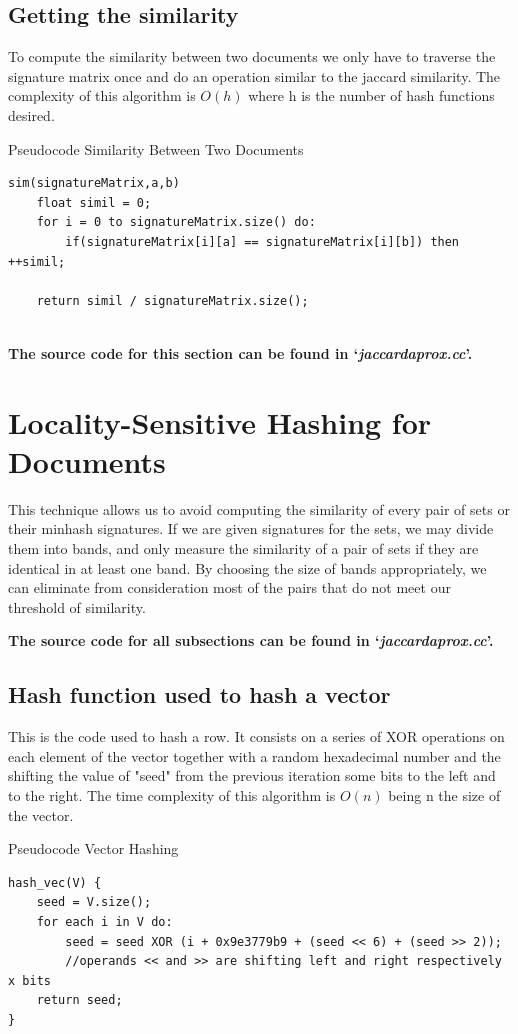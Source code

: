 \documentclass[12pt]{article}
\begin{document}
\subsection{Getting the similarity}
To compute the similarity between two documents we only have to traverse the signature matrix once and do an operation similar to the jaccard similarity. The complexity of this algorithm is $O(h)$ where h is the number of hash functions desired.
\begin{center}
\begin{large}
Pseudocode Similarity Between Two Documents
\end{large}
\end{center}
\begin{lstlisting}
sim(signatureMatrix,a,b)
    float simil = 0;
    for i = 0 to signatureMatrix.size() do:
        if(signatureMatrix[i][a] == signatureMatrix[i][b]) then ++simil;
 
    return simil / signatureMatrix.size();


\end{lstlisting}

\textbf{The source code for this section can be found in `\textit{jaccardaprox.cc}'.}
\bigskip

\section{Locality-Sensitive Hashing for Documents}
 This technique allows us to avoid computing the similarity of every pair of sets or their minhash signatures. If we are given signatures for the sets, we may divide them into bands, and only measure the similarity of a pair of sets if they are identical in at least one band. By choosing the size of bands appropriately, we can eliminate from consideration most of the pairs that do not meet our threshold of similarity.
\medskip 
 
 \textbf{The source code for all subsections can be found in `\textit{jaccardaprox.cc}'.}
\bigskip
 
\subsection{Hash function used to hash a vector}
This is the code used to hash a row. It consists on a series of XOR operations on each element of the vector together with a random hexadecimal number and the shifting the value of "seed" from the previous iteration some bits to the left and to the right. The time complexity of this algorithm is $O(n)$ being n the size of the vector. 
\begin{center}
\begin{large}
Pseudocode Vector Hashing
\end{large}
\end{center}
 \begin{lstlisting}
hash_vec(V) {
	seed = V.size();
	for each i in V do:
		seed = seed XOR (i + 0x9e3779b9 + (seed << 6) + (seed >> 2));
		//operands << and >> are shifting left and right respectively x bits
	return seed;
}

\end{lstlisting}
 \medskip 
\end{document}
